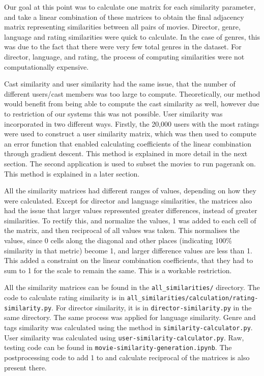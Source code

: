 \documentclass[11pt]{article}
\begin{document}
Our goal at this point was to calculate one matrix for each similarity
parameter, and take a linear combination of these matrices to obtain the
final adjacency matrix representing similarities between all pairs of
movies. Director, genre, language and rating similarities were quick to
calculate. In the case of genres, this was due to the fact that there
were very few total genres in the dataset. For director, language, and
rating, the process of computing similarities were not computationally
expensive.

Cast similarity and user similarity had the same issue, that the number
of different users/cast members was too large to compute. Theoretically,
our method would benefit from being able to compute the cast similarity
as well, however due to restriction of our systems this was not
possible. User similarity was incorporated in two different ways.
Firstly, the 20,000 users with the most ratings were used to construct a
user similarity matrix, which was then used to compute an error function
that enabled calculating coefficients of the linear combination through
gradient descent. This method is explained in more detail in the next
section. The second application is used to subset the movies to run
pagerank on. This method is explained in a later section.

All the similarity matrices had different ranges of values, depending on
how they were calculated. Except for director and language similarities,
the matrices also had the issue that larger values represented greater
differences, instead of greater similarities. To rectify this, and
normalize the values, 1 was added to each cell of the matrix, and then
reciprocal of all values was taken. This normalises the values, since 0
cells along the diagonal and other places (indicating 100\% similarity
in that metric) become 1, and larger difference values are less than 1.
This added a constraint on the linear combination coefficients, that
they had to sum to 1 for the scale to remain the same. This is a
workable restriction.

All the similarity matrices can be found in the
\texttt{all\_similarities/} directory. The code to calculate rating
similarity is in
\texttt{all\_similarities/calculation/rating-similarity.py}. For
director similarity, it is in \texttt{director-similarity.py} in the
same directory. The same process was applied for language similarity.
Genre and tags similarity was calculated using the method in
\texttt{similarity-calculator.py}. User similarity was calculated using
\texttt{user-similarity-calculator.py}. Raw, testing code can be found
in \texttt{movie-similarity-generation.ipynb}. The postprocessing code
to add 1 to and calculate reciprocal of the matrices is also present
there.
\end{document}
